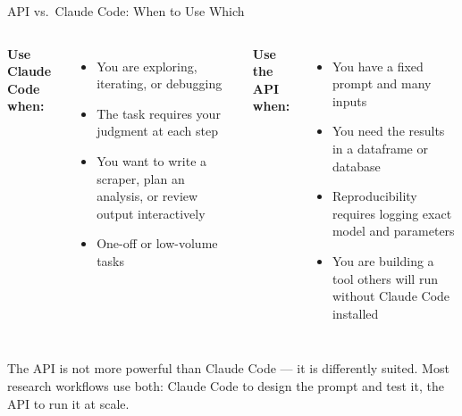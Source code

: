 \documentclass[aspectratio=169, 11pt]{beamer}
\begin{document}
\begin{frame}{API vs.\ Claude Code: When to Use Which}
  \begin{columns}[T]
    \textbf{Use Claude Code when:}
    \begin{itemize}\small
      \item You are exploring, iterating, or debugging
      \item The task requires your judgment at each step
      \item You want to write a scraper, plan an analysis, or review output interactively
      \item One-off or low-volume tasks
    \end{itemize}

    \textbf{Use the API when:}
    \begin{itemize}\small
      \item You have a fixed prompt and many inputs
      \item You need the results in a dataframe or database
      \item Reproducibility requires logging exact model and parameters
      \item You are building a tool others will run without Claude Code installed
    \end{itemize}
  \end{columns}

  \vspace{0.8em}
  \alert{\small The API is not more powerful than Claude Code --- it is differently suited. Most research workflows use both: Claude Code to design the prompt and test it, the API to run it at scale.}
\end{frame}
\end{document}
